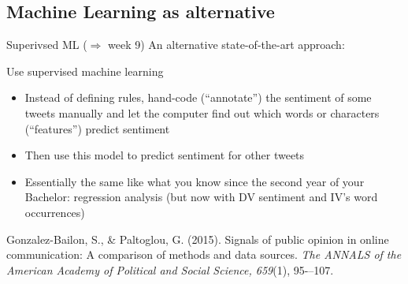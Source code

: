 \documentclass{beamer}
\begin{document}
\subsection{Machine Learning as alternative}
\begin{frame}{Superivsed ML ($\Rightarrow$ week 9)}
	An alternative state-of-the-art approach:
	\begin{block}{Use supervised machine learning}
		\begin{itemize}
			\item Instead of defining rules, hand-code (``annotate'') the sentiment of some tweets manually and let the computer find out which words or characters (``features'') predict sentiment
			\item Then use this model to predict sentiment for other tweets
			\item Essentially the same like what you know since the second year of your Bachelor: regression analysis (but now with DV sentiment and IV's word occurrences)
		\end{itemize}
		\tiny{Gonzalez-Bailon, S., \& Paltoglou, G. (2015). Signals of public opinion in online communication: A comparison of methods and data sources. \emph{The ANNALS of the American Academy of Political and Social Science, 659}(1), 95-–107.}
	\end{block}
	
\end{frame}
\end{document}
